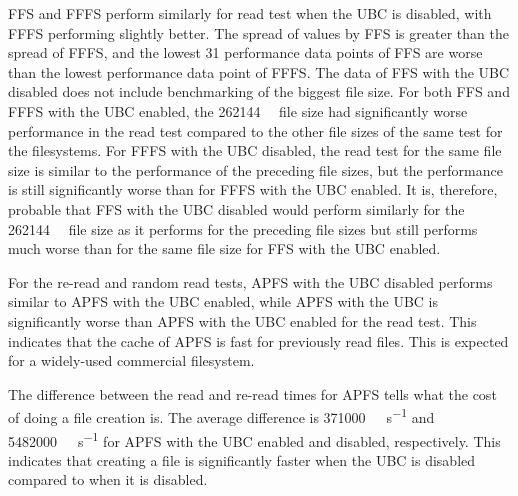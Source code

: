 \gls{FFS} and \gls{FFFS} perform similarly for read test when the \gls{UBC} is disabled, with \gls{FFFS} performing slightly better. The spread of values by \gls{FFS} is greater than the spread of \gls{FFFS}, and the lowest 31 performance data points of \gls{FFS} are worse than the lowest performance data point of \gls{FFFS}. The data of \gls{FFS} with the \gls{UBC} disabled does not include benchmarking of the biggest file size. For both \gls{FFS} and \gls{FFFS} with the \gls{UBC} enabled, the \SI{262144}{\kilo\byte} file size had significantly worse performance in the read test compared to the other file sizes of the same test for the filesystems. For \gls{FFFS} with the \gls{UBC} disabled, the read test for the same file size is similar to the performance of the preceding file sizes, but the performance is still significantly worse than for \gls{FFFS} with the \gls{UBC} enabled. It is, therefore, probable that \gls{FFS} with the \gls{UBC} disabled would perform similarly for the \SI{262144}{\kilo\byte} file size as it performs for the preceding file sizes but still performs much worse than for the same file size for \gls{FFS} with the \gls{UBC} enabled.

For the \mbox{re-read} and random read tests, \gls{APFS} with the \gls{UBC} disabled performs similar to \gls{APFS} with the \gls{UBC} enabled, while \gls{APFS} with the \gls{UBC} is significantly worse than \gls{APFS} with the \gls{UBC} enabled for the read test. This indicates that the cache of \gls{APFS} is fast for previously read files. This is expected for a \mbox{widely-used} commercial filesystem.

The difference between the read and re-read times for \gls{APFS} tells what the cost of doing a file creation is. The average difference is \SI[per-mode = symbol]{371000}{\kilo\bit\per\second} and \SI[per-mode = symbol]{5482000}{\kilo\bit\per\second} for \gls{APFS} with the \gls{UBC} enabled and disabled, respectively. This indicates that creating a file is significantly faster when the \gls{UBC} is disabled compared to when it is disabled.


